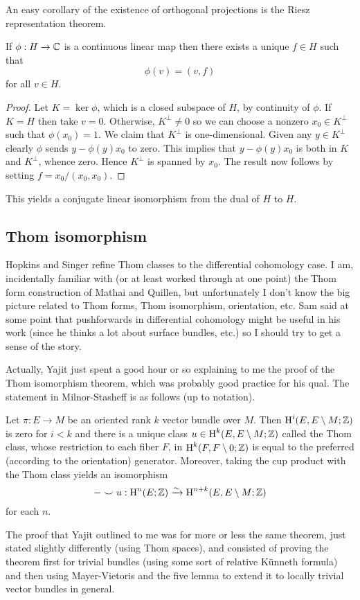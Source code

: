 \documentclass{amsart}
\begin{document}
An easy corollary of the existence of orthogonal projections is the
Riesz representation theorem.
\begin{proposition}
    If $\phi:H\to\mathbb{C}$ is a continuous linear map then there exists a
    unique $f\in H$ such that
    \begin{equation*}
        \phi(v) = (v, f)
    \end{equation*}
    for all $v\in H$.
\end{proposition}
\begin{proof}
    Let $K=\ker \phi$, which is a closed subspace of $H$, by continuity of $\phi$.
    If $K=H$ then take $v=0$.
    Otherwise, $K^\perp\neq0$ so we can choose a nonzero $x_0\in K^\perp$ such that
    $\phi(x_0)=1$. We claim that $K^\perp$ is one-dimensional. Given any $y\in K^\perp$
    clearly $\phi$ sends $y-\phi(y)x_0$ to zero. This implies that $y-\phi(y)x_0$
    is both in $K$ and $K^\perp$, whence zero. Hence $K^\perp$ is spanned by $x_0$.
    The result now follows by setting $f=x_0/(x_0,x_0)$.
\end{proof}
This yields a conjugate linear isomorphism from the dual of $H$ to $H$.

\subsection{Thom isomorphism}
Hopkins and Singer refine Thom classes to the differential cohomology case.
I am, incidentally familiar with (or at least worked through at one point) the
Thom form construction of Mathai and Quillen, but unfortunately I don't know
the big picture related to Thom forms, Thom isomorphism, orientation, etc.
Sam said at some point that pushforwards in differential cohomology might
be useful in his work (since he thinks a lot about surface bundles, etc.)
so I should try to get a sense of the story.

Actually, Yajit just spent a good hour or so explaining to me the proof of
the Thom isomorphism theorem, which was probably good practice for his qual.
The statement in Milnor-Stasheff is as follows (up to notation).
\begin{theorem}
    Let $\pi:E\to M$ be an oriented rank $k$ vector bundle over $M$. Then
    $\operatorname{H}^i(E, E\setminus M;\mathbb{Z})$ is zero for $i<k$ and there is a unique class
    $u\in\operatorname{H}^k(E,E\setminus M;\mathbb{Z})$ called the Thom class, whose restriction
    to each fiber $F$, in $\operatorname{H}^k(F, F\setminus 0;\mathbb{Z})$ is equal to the
    preferred (according to the orientation) generator. Moreover, taking the
    cup product with the Thom class yields an isomorphism
    \begin{equation*}
        -\smile u : \operatorname{H}^n(E;\mathbb{Z}) \xrightarrow{\sim} \operatorname{H}^{n+k}(E,E\setminus M;\mathbb{Z})
    \end{equation*}
    for each $n$.
\end{theorem}
The proof that Yajit outlined to me was for more or less the same theorem, just
stated slightly differently (using Thom spaces), and consisted of proving the theorem first for
trivial bundles (using some sort of relative K\"unneth formula) and then
using Mayer-Vietoris and the five lemma to extend it to locally trivial vector
bundles in general.
\end{document}
